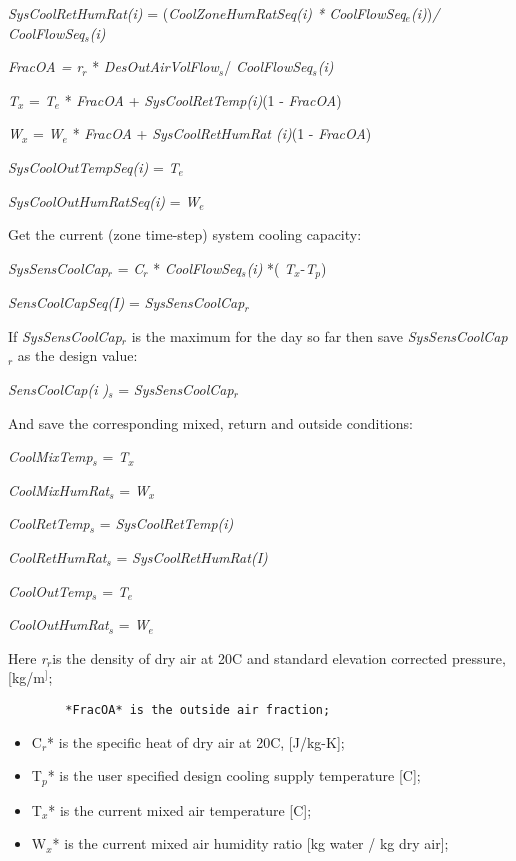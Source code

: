 \emph{SysCoolRetHumRat(i)} = (\emph{CoolZoneHumRatSeq(i) * CoolFlowSeq\(_{e}\)(i)})\emph{/ CoolFlowSeq\(_{s}\)(i)}

\emph{FracOA = r\(_{r}\)} * \emph{DesOutAirVolFlow\(_{s}\)}/ \emph{CoolFlowSeq\(_{s}\)(i)}

\emph{T\(_{x}\)} = \emph{T\(_{e}\)} * \emph{FracOA} + \emph{SysCoolRetTemp(i)}(1 - \emph{FracOA})

\emph{W\(_{x}\)} = \emph{W\(_{e}\)} * \emph{FracOA} + \emph{SysCoolRetHumRat (i)}(1 - \emph{FracOA})

\emph{SysCoolOutTempSeq(i)} = \emph{T\(_{e}\)}

\emph{SysCoolOutHumRatSeq(i)} = \emph{W\(_{e}\)}

Get the current (zone time-step) system cooling capacity:

\emph{SysSensCoolCap\(_{r}\)} = \emph{C\(_{r}\)} * \emph{CoolFlowSeq\(_{s}\)(i)} *( \emph{T\(_{x}\)}-\emph{T\(_{p}\)})

\emph{SensCoolCapSeq(I)} = \emph{SysSensCoolCap\(_{r}\)}

If \emph{SysSensCoolCap\(_{r}\)} is the maximum for the day so far then save \emph{SysSensCoolCap\(_{r}\)} as the design value:

\emph{SensCoolCap(i )\(_{s}\)} = \emph{SysSensCoolCap\(_{r}\)}

And save the corresponding mixed, return and outside conditions:

\emph{CoolMixTemp\(_{s}\)} = \emph{T\(_{x}\)}

\emph{CoolMixHumRat\(_{s}\)} = \emph{W\(_{x}\)}

\emph{CoolRetTemp\(_{s}\)} = \emph{SysCoolRetTemp(i)}

\emph{CoolRetHumRat\(_{s}\)} = \emph{SysCoolRetHumRat(I)}

\emph{CoolOutTemp\(_{s}\)} = \emph{T\(_{e}\)}

\emph{CoolOutHumRat\(_{s}\)} = \emph{W\(_{e}\)}

Here \emph{r\(_{r}\)}is the density of dry air at 20C and standard elevation corrected pressure, {[}kg/m\(^{]}\);

\begin{lstlisting}
        *FracOA* is the outside air fraction;
\end{lstlisting}

\begin{itemize}
\item
  C\(_{r}\)* is the specific heat of dry air at 20C, {[}J/kg-K{]};
\item
  T\(_{p}\)* is the user specified design cooling supply temperature {[}C{]};
\item
  T\(_{x}\)* is the current mixed air temperature {[}C{]};
\item
  W\(_{x}\)* is the current mixed air humidity ratio {[}kg water / kg dry air{]};
\end{itemize}

